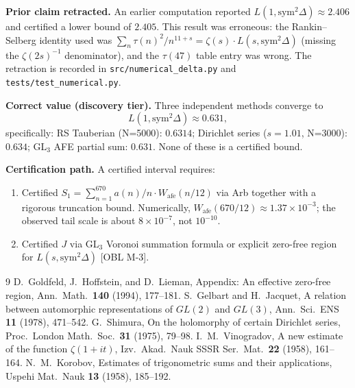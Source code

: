 \documentclass[12pt]{article}
\begin{document}
\textbf{Prior claim retracted.}  An earlier computation reported
$L(1, \mathrm{sym}^2 \Delta) \approx 2.406$ and certified a lower bound of $2.405$.
This result was erroneous: the Rankin--Selberg identity used was
$\sum_n \tau(n)^2/n^{11+s} = \zeta(s) \cdot L(s, \mathrm{sym}^2\Delta)$
(missing the $\zeta(2s)^{-1}$ denominator), and the $\tau(47)$ table entry was wrong.
The retraction is recorded in \texttt{src/numerical\_delta.py} and \texttt{tests/test\_numerical.py}.

\textbf{Correct value (discovery tier).}  Three independent methods converge to
\[
  L(1, \mathrm{sym}^2 \Delta) \approx 0.631,
\]
specifically: RS Tauberian (N=5000): $0.6314$; Dirichlet series ($s=1.01$, N=3000): $0.634$;
GL$_3$ AFE partial sum: $0.631$.  None of these is a certified bound.

\textbf{Certification path.}  A certified interval requires:
\begin{enumerate}
  \item Certified $S_1 = \sum_{n=1}^{670} a(n)/n \cdot W_{\mathrm{afe}}(n/12)$ via Arb
        together with a rigorous truncation bound.  Numerically,
        $W_{\mathrm{afe}}(670/12) \approx 1.37\times10^{-3}$; the observed tail scale
        is about $8\times10^{-7}$, not $10^{-10}$.
  \item Certified $J$ via GL$_3$ Voronoi summation formula or explicit zero-free region
        for $L(s, \mathrm{sym}^2\Delta)$ [OBL M-3].
\end{enumerate}

\begin{thebibliography}{9}
 D.~Goldfeld, J.~Hoffstein, and D.~Lieman, Appendix: An effective
  zero-free region, Ann.\ Math.\ \textbf{140} (1994), 177--181.
 S.~Gelbart and H.~Jacquet, A relation between automorphic
  representations of $GL(2)$ and $GL(3)$, Ann.\ Sci.\ ENS \textbf{11} (1978), 471--542.
 G.~Shimura, On the holomorphy of certain Dirichlet series,
  Proc.\ London Math.\ Soc.\ \textbf{31} (1975), 79--98.
 I.~M.~Vinogradov, A new estimate of the function $\zeta(1+it)$,
  Izv.\ Akad.\ Nauk SSSR Ser.\ Mat.\ \textbf{22} (1958), 161--164.
 N.~M.~Korobov, Estimates of trigonometric sums and their applications,
  Uspehi Mat.\ Nauk \textbf{13} (1958), 185--192.
\end{thebibliography}
\end{document}
